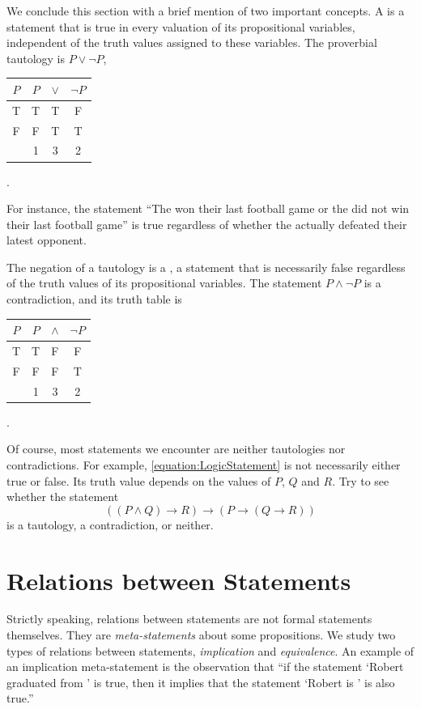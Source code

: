 We conclude this section with a brief mention of two important concepts.
A  is a statement that is true in every valuation of its propositional variables, independent of the truth values assigned to these variables.
The proverbial tautology is $P \vee \neg P$,
\begin{center}
\begin{tabular}{|c|c:c:c|}
\hline
$P$ & $P$ & $\vee$ & $\neg P$ \tabularnewline
\hline
T & T & T & F \tabularnewline
F & F & T & T \tabularnewline
& 1 & 3 & 2 \tabularnewline
\hline
\end{tabular} .
\end{center}
For instance, the statement ``The \mascots won their last football game or the \mascots did not win their last football game'' is true regardless of whether the \mascots actually defeated their latest opponent.

The negation of a tautology is a , a statement that is necessarily false regardless of the truth values of its propositional variables.
The statement $P \wedge \neg P$ is a contradiction, and its truth table is
\begin{center}
\begin{tabular}{|c|c:c:c|}
\hline
$P$ & $P$ & $\wedge$ & $\neg P$ \tabularnewline
\hline
T & T & F & F \tabularnewline
F & F & F & T \tabularnewline
& 1 & 3 & 2 \tabularnewline
\hline
\end{tabular} .
\end{center}

Of course, most statements we encounter are neither tautologies nor contradictions.
For example, \eqref{equation:LogicStatement} is not necessarily either true or false.
Its truth value depends on the values of $P$, $Q$ and $R$.
Try to see whether the statement
\begin{equation*}
((P \wedge Q) \rightarrow R) \rightarrow (P \rightarrow (Q \rightarrow R))
\end{equation*}
is a tautology, a contradiction, or neither.


\section{Relations between Statements}
\label{section:Relations}

Strictly speaking, relations between statements are not formal statements themselves.
They are \emph{meta-statements} about some propositions.
We study two types of relations between statements, \emph{implication} and \emph{equivalence}.
An example of an implication meta-statement is the observation that ``if the statement `Robert graduated from \univ' is true, then it implies that the statement `Robert is \mascot' is also true.''

